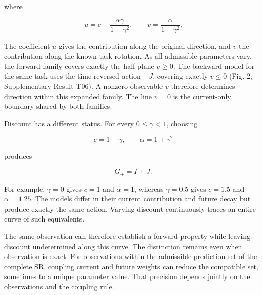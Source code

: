 \documentclass[11pt,a4paper]{article}
\begin{document}
\par
\noindent\begin{minipage}{\linewidth}

where

\[
u=c-\frac{\alpha\gamma}{1+\gamma^2},\qquad
v=\frac{\alpha}{1+\gamma^2}.
\]

\end{minipage}\par

The coefficient \(u\) gives the contribution along the original
direction, and \(v\) the contribution along the known task rotation. As
all admissible parameters vary, the forward family covers exactly the
half-plane \(v\geq0\). The backward model for the same task uses the
time-reversed action \(-J\), covering exactly \(v\leq0\) (Fig. 2;
Supplementary Result T06). A nonzero observable \(v\) therefore
determines direction within this expanded family. The line \(v=0\) is
the current-only boundary shared by both families.

\par
\noindent\begin{minipage}{\linewidth}

Discount has a different status. For every \(0\leq\gamma<1\), choosing

\[
c=1+\gamma,\qquad \alpha=1+\gamma^2
\]

\end{minipage}\par

\par
\noindent\begin{minipage}{\linewidth}

produces

\[
G_+=I+J.
\]

\end{minipage}\par

For example, \(\gamma=0\) gives \(c=1\) and \(\alpha=1\), whereas
\(\gamma=0.5\) gives \(c=1.5\) and \(\alpha=1.25\). The models differ in
their current contribution and future decay but produce exactly the same
action. Varying discount continuously traces an entire curve of such
equivalents.

The same observation can therefore establish a forward property while
leaving discount undetermined along this curve. The distinction remains
even when observation is exact. For observations within the admissible
prediction set of the complete SR, coupling current and future weights
can reduce the compatible set, sometimes to a unique parameter value.
That precision depends jointly on the observations and the coupling
rule.
\end{document}
